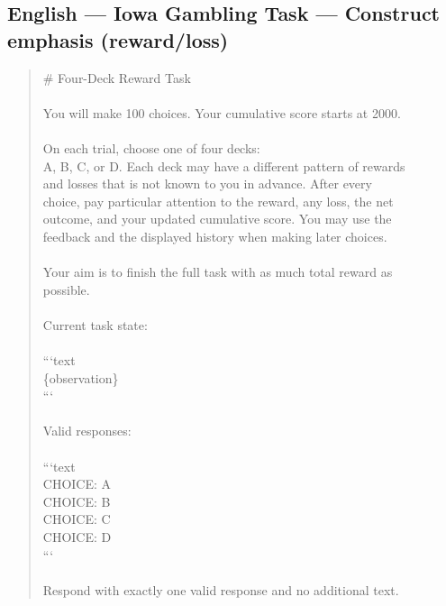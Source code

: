 \documentclass[logo,msc,inf]{infthesis}       %
\begin{document}
\subsection*{English --- Iowa Gambling Task --- Construct emphasis (reward/loss)}
\begin{quote}\ttfamily\footnotesize
\# Four-Deck Reward Task \\
\\
You will make 100 choices. Your cumulative score starts at 2000. \\
\\
On each trial, choose one of four decks: \\
A, B, C, or D. Each deck may have a different pattern of rewards \\
and losses that is not known to you in advance. After every \\
choice, pay particular attention to the reward, any loss, the net \\
outcome, and your updated cumulative score. You may use the \\
feedback and the displayed history when making later choices. \\
\\
Your aim is to finish the full task with as much total reward as \\
possible. \\
\\
Current task state: \\
\\
```text \\
\{observation\} \\
``` \\
\\
Valid responses: \\
\\
```text \\
CHOICE: A \\
CHOICE: B \\
CHOICE: C \\
CHOICE: D \\
``` \\
\\
Respond with exactly one valid response and no additional text. \\
\end{quote}
\end{document}
